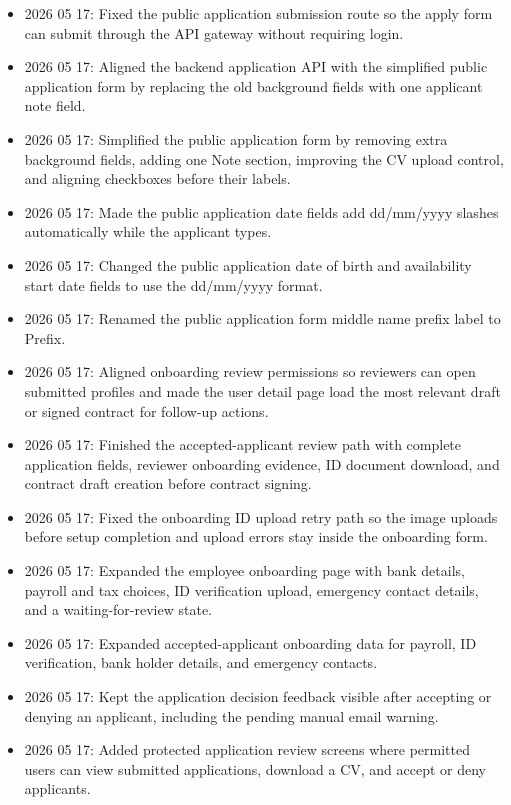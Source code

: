 \documentclass[11pt]{article}
\begin{document}
\begin{itemize}
    \item 2026 05 17: Fixed the public application submission route so the apply form can submit through the API gateway without requiring login.
    \item 2026 05 17: Aligned the backend application API with the simplified public application form by replacing the old background fields with one applicant note field.
    \item 2026 05 17: Simplified the public application form by removing extra background fields, adding one Note section, improving the CV upload control, and aligning checkboxes before their labels.
    \item 2026 05 17: Made the public application date fields add dd/mm/yyyy slashes automatically while the applicant types.
    \item 2026 05 17: Changed the public application date of birth and availability start date fields to use the dd/mm/yyyy format.
    \item 2026 05 17: Renamed the public application form middle name prefix label to Prefix.
    \item 2026 05 17: Aligned onboarding review permissions so reviewers can open submitted profiles and made the user detail page load the most relevant draft or signed contract for follow-up actions.
    \item 2026 05 17: Finished the accepted-applicant review path with complete application fields, reviewer onboarding evidence, ID document download, and contract draft creation before contract signing.
    \item 2026 05 17: Fixed the onboarding ID upload retry path so the image uploads before setup completion and upload errors stay inside the onboarding form.
    \item 2026 05 17: Expanded the employee onboarding page with bank details, payroll and tax choices, ID verification upload, emergency contact details, and a waiting-for-review state.
    \item 2026 05 17: Expanded accepted-applicant onboarding data for payroll, ID verification, bank holder details, and emergency contacts.
    \item 2026 05 17: Kept the application decision feedback visible after accepting or denying an applicant, including the pending manual email warning.
    \item 2026 05 17: Added protected application review screens where permitted users can view submitted applications, download a CV, and accept or deny applicants.

\end{itemize}
\end{document}
